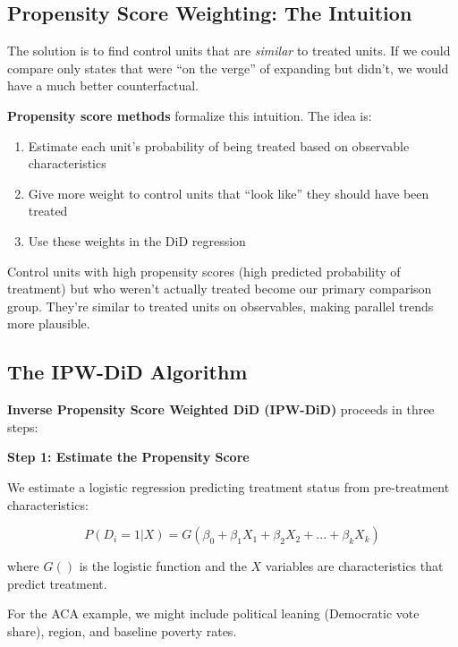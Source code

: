 \documentclass[
  letterpaper,
  DIV=11,
  numbers=noendperiod]{scrreprt}
\providecommand{\tightlist}{%
  \setlength{\itemsep}{0pt}\setlength{\parskip}{0pt}}
\begin{document}
\subsection{Propensity Score Weighting: The
Intuition}\label{propensity-score-weighting-the-intuition}

The solution is to find control units that are \emph{similar} to treated
units. If we could compare only states that were ``on the verge'' of
expanding but didn't, we would have a much better counterfactual.

\textbf{Propensity score methods} formalize this intuition. The idea is:

\begin{enumerate}
\def\labelenumi{\arabic{enumi}.}
\tightlist
\item
  Estimate each unit's probability of being treated based on observable
  characteristics
\item
  Give more weight to control units that ``look like'' they should have
  been treated
\item
  Use these weights in the DiD regression
\end{enumerate}

Control units with high propensity scores (high predicted probability of
treatment) but who weren't actually treated become our primary
comparison group. They're similar to treated units on observables,
making parallel trends more plausible.

\subsection{The IPW-DiD Algorithm}\label{the-ipw-did-algorithm}

\textbf{Inverse Propensity Score Weighted DiD (IPW-DiD)} proceeds in
three steps:

\textbf{Step 1: Estimate the Propensity Score}

We estimate a logistic regression predicting treatment status from
pre-treatment characteristics:

\[
P(D_i = 1 | X) = G(\beta_0 + \beta_1 X_1 + \beta_2 X_2 + ... + \beta_k X_k)
\]

where \(G()\) is the logistic function and the \(X\) variables are
characteristics that predict treatment.

For the ACA example, we might include political leaning (Democratic vote
share), region, and baseline poverty rates.
\end{document}
